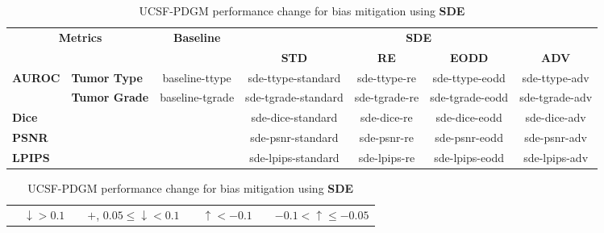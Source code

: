 \begin{table}[]
    \centering
    \caption{UCSF-PDGM performance change for bias mitigation using \textbf{SDE}}
    \label{tab:ucsf_perf_sde}
    \begin{tabular}{ll|c|cccc}
    \hline
    \multicolumn{2}{c|}{\multirow{2}{*}{\textbf{Metrics}}} 
    & \multirow{2}{*}{\textbf{Baseline}} 
    & \multicolumn{4}{c}{\textbf{SDE}} \\
    \cline{4-7}
    \multicolumn{2}{c|}{} 
    & 
    & \textbf{STD} & \textbf{RE} & \textbf{EODD} & \textbf{ADV} \\
    \hline

    \multirow{2}{*}{\textbf{AUROC}} 
    & \textbf{Tumor Type} & baseline-ttype & sde-ttype-standard & sde-ttype-re & sde-ttype-eodd & sde-ttype-adv \\
    & \textbf{Tumor Grade} & baseline-tgrade & sde-tgrade-standard & sde-tgrade-re & sde-tgrade-eodd & sde-tgrade-adv \\
    \cline{1-2}

    \multicolumn{2}{l|}{\textbf{Dice}} & \cellcolor[HTML]{C0C0C0} 
    & sde-dice-standard & sde-dice-re & sde-dice-eodd & sde-dice-adv \\
    \cline{1-2}

    \multicolumn{2}{l|}{\textbf{PSNR}} & \cellcolor[HTML]{C0C0C0} 
    & sde-psnr-standard & sde-psnr-re & sde-psnr-eodd & sde-psnr-adv \\
    \cline{1-2}

    \multicolumn{2}{l|}{\textbf{LPIPS}} & \cellcolor[HTML]{C0C0C0} 
    & sde-lpips-standard & sde-lpips-re & sde-lpips-eodd & sde-lpips-adv \\
    \hline
    \end{tabular}

    \begin{tabular}{llllllll} 
        \cellcolor[HTML]{E6C321} & $ \downarrow > 0.1$ & 
        \cellcolor[HTML]{F1D892} &$+$, $0.05 \leq \downarrow < 0.1$ & 
        \cellcolor[HTML]{3089A2} & $\uparrow < -0.1$  & 
        \cellcolor[HTML]{93C1C9} & $-0.1 < \uparrow \leq -0.05$ \\
    \end{tabular}
\end{table}